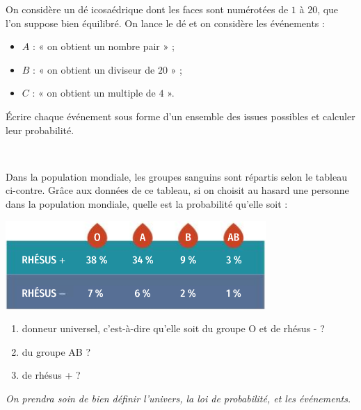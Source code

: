 \documentclass[11pt]{article}
\begin{document}
\begin{exo}
  On considère un dé icosaédrique dont les faces sont numérotées de $1$ à $20$,
  que l'on suppose bien équilibré. On lance le dé et on considère les événements
  :
  \begin{itemize}
    \item $A$ : « on obtient un nombre pair » ;
    \item $B$ : « on obtient un diviseur de $20$ » ;
    \item $C$ : « on obtient un multiple de $4$ ».
  \end{itemize}
  Écrire chaque événement sous forme d'un ensemble des issues possibles et
  calculer leur probabilité.
\end{exo}

\begin{exo}~\\
  \begin{minipage}[]{.5\textwidth}
    Dans la population mondiale, les groupes sanguins sont répartis selon le
    tableau ci-contre. Gr\^ace aux données de ce tableau, si on choisit au
    hasard une personne dans la population mondiale, quelle est la probabilité
    qu'elle soit :
  \end{minipage}
  \begin{minipage}[]{.5\textwidth}
    \begin{center}
      \includegraphics[scale=.6]{sang.png}
    \end{center}
  \end{minipage}
  \begin{enumerate}
    \item donneur universel, c'est-à-dire qu'elle soit du groupe O et de
        rhésus - ?
    \item du groupe AB ?
    \item de rhésus + ?
  \end{enumerate}
  \emph{On prendra soin de bien définir l'univers, la loi de probabilité, et les
  événements.}
\end{exo}
\end{document}
